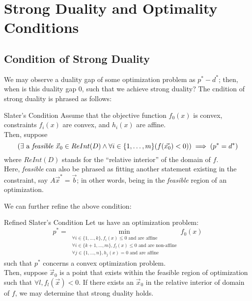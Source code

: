 \chapter{Strong Duality and Optimality Conditions}

\section{Condition of Strong Duality}
We may observe a duality gap of some optimization problem as $p^* - d^*$; then, when is this duality gap $0$, such that we achieve strong duality?
The cndition of strong duality is phrased as follows:
\begin{ln-define}{Slater's Condition}{}
    Assume that the objective function $f_0 (x)$ is convex, constraints $f_i(x)$ are convex, and $h_i(x)$ are affine. \\
    Then, suppose
    \[
        (\exists \text{ a \textit{feasible} }\vec{x}_0 \in ReInt(D) \land \forall i \in \{1, \dots, m\} (f({\vec{x_0}}) < 0)) \implies (p^* = d^*)
    \]
    where $ReInt(D)$ stands for the ``relative interior'' of the domain of $f$. \\
    Here, \textit{feasible} can also be phrased as fitting another statement existing in the constraint, say $A \vec{x}^* = \vec{b}$; in other words, being in the \textit{feasible} region of an optimization.
\end{ln-define}
We can further refine the above condition:
\begin{ln-define}{Refined Slater's Condition}{}
    Let us have an optimization problem:
    \[
        p^* = \min_{
            \substack{
                \forall i \in \{1, \dots, k\}, f_i(x) \leq 0 \text{ and are affine} \\
                \forall i \in \{k + 1, \dots, m\}, f_l(x) \leq 0 \text{ and are non-affine} \\
                \forall j \in \{1, \dots, n\}, h_j(x) = 0 \text{ and are affine}
            }
        } f_0 (x)
    \]
    such that $p^*$ concerns a convex optimization problem. \\
    Then, suppose $\vec{x}_0$ is a point that exists within the feasible region of optimization such that $\forall l, f_l (\vec{x}) < 0$.
    If there exists an $\vec{x}_0$ in the relative interior of domain of $f$, we may determine that strong duality holds.
\end{ln-define}

